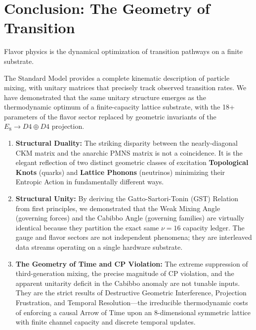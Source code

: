 \section{Conclusion: The Geometry of Transition}
Flavor physics is the dynamical optimization of transition pathways on a finite substrate. 

The Standard Model provides a complete kinematic description of particle mixing, with unitary matrices that precisely track observed transition rates. We have demonstrated that the same unitary structure emerges as the thermodynamic optimum of a finite-capacity lattice substrate, with the 18+ parameters of the flavor sector replaced by geometric invariants of the $E_8 \to D4 \oplus D4$ projection.


\begin{enumerate}
    \item \textbf{Structural Duality:} The striking disparity between the nearly-diagonal CKM matrix and the anarchic PMNS matrix is not a coincidence. It is the elegant reflection of two distinct geometric classes of excitation \textbf{Topological Knots} (quarks) and \textbf{Lattice Phonons} (neutrinos) minimizing their Entropic Action in fundamentally different ways.
    
    \item \textbf{Structural Unity:} By deriving the Gatto-Sartori-Tonin (GST) Relation from first principles, we demonstrated that the Weak Mixing Angle (governing forces) and the Cabibbo Angle (governing families) are virtually identical because they partition the exact same $\nu=16$ capacity ledger. The gauge and flavor sectors are not independent phenomena; they are interleaved data streams operating on a single hardware substrate.
    
    \item \textbf{The Geometry of Time and CP Violation:} The extreme suppression of third-generation mixing, the precise magnitude of CP violation, and the apparent unitarity deficit in the Cabibbo anomaly are not tunable inputs. They are the strict results of Destructive Geometric Interference, Projection Frustration, and Temporal Resolution—the irreducible thermodynamic costs of enforcing a causal Arrow of Time upon an 8-dimensional symmetric lattice with finite channel capacity and discrete temporal updates.
\end{enumerate}

